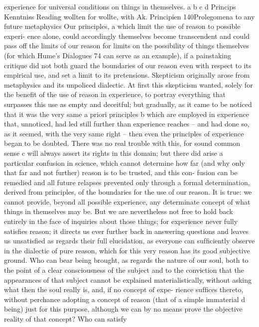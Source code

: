 experience for universal conditions on things in themselves.
a
b
c
d
Princips
Kenntniss
Reading wollten for wollte, with Ak.
Principien
140Prolegomena to any future metaphysics
Our principles, a which limit the use of reason to possible experi-
ence alone, could accordingly themselves become transcendent and could
pass off the limits of our reason for limits on the possibility of things
themselves (for which Hume’s Dialogues 74 can serve as an example), if
a painstaking critique did not both guard the boundaries of our reason
even with respect to its empirical use, and set a limit to its pretensions.
Skepticism originally arose from metaphysics and its unpoliced dialectic.
At ﬁrst this skepticism wanted, solely for the beneﬁt of the use of reason
in experience, to portray everything that surpasses this use as empty and
deceitful; but gradually, as it came to be noticed that it was the very same a
priori principles b which are employed in experience that, unnoticed, had
led still further than experience reaches – and had done so, as it seemed,
with the very same right – then even the principles of experience began
to be doubted. There was no real trouble with this, for sound common
sense c will always assert its rights in this domain; but there did arise a
particular confusion in science, which cannot determine how far (and
why only that far and not further) reason is to be trusted, and this con-
fusion can be remedied and all future relapses prevented only through
a formal determination, derived from principles, of the boundaries for
the use of our reason.
It is true: we cannot provide, beyond all possible experience, any
determinate concept of what things in themselves may be. But we are
nevertheless not free to hold back entirely in the face of inquiries about
those things; for experience never fully satisﬁes reason; it directs us ever
further back in answering questions and leaves us unsatisﬁed as regards
their full elucidation, as everyone can sufﬁciently observe in the dialectic
of pure reason, which for this very reason has its good subjective ground.
Who can bear being brought, as regards the nature of our soul, both to
the point of a clear consciousness of the subject and to the conviction
that the appearances of that subject cannot be explained materialistically,
without asking what then the soul really is, and, if no concept of expe-
rience sufﬁces thereto, without perchance adopting a concept of reason
(that of a simple immaterial d being) just for this purpose, although we can
by no means prove the objective reality of that concept? Who can satisfy
